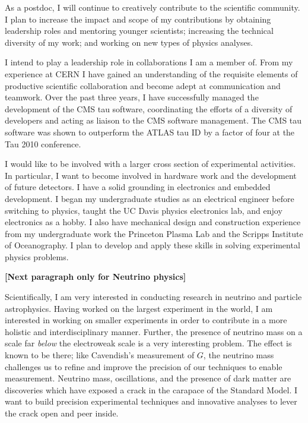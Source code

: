 \documentclass{scrartcl}        %
\begin{document}
\begin{cv}{}
As a postdoc, I will continue to creatively contribute to the scientific
community. I plan to increase the impact and scope of my contributions by
obtaining leadership roles and mentoring younger scientists; increasing the
technical diversity of my work; and working on new types of physics analyses.

I intend to play a leadership role in collaborations I am a member of. From my
experience at CERN I have gained an understanding of the requisite elements of
productive scientific collaboration and become adept at communication and
teamwork. Over the past three years, I have successfully managed the
development of the CMS tau software, coordinating the efforts of a diversity of
developers and acting as liaison to the CMS software management.  The CMS tau
software was shown to outperform the ATLAS tau ID by a factor of four at the Tau
2010 conference. 

I would like to be involved with a larger cross section of experimental
activities.  In particular, I want to become involved in hardware work and the
development of future detectors. I have a solid grounding in electronics and
embedded development. I began my undergraduate studies as an electrical engineer
before switching to physics, taught the UC Davis physics electronics lab, and
enjoy electronics as a hobby.  I also have mechanical design and construction
experience from my undergraduate work the Princeton Plasma Lab and the Scripps
Institute of Oceanography. I plan to develop and apply these skills in solving
experimental physics problems.

\textbf{[Next paragraph only for Neutrino physics]}

Scientifically, I am very interested in conducting research in neutrino and
particle astrophysics. Having worked on the largest experiment in the world, I
am interested in working on smaller experiments in order to contribute in a more
holistic and interdisciplinary manner. Further, the presence of neutrino mass on
a scale far \emph{below} the electroweak scale is a very interesting problem.
The effect is known to be there; like Cavendish's measurement of $G$, the
neutrino mass challenges us to refine and improve the precision of our
techniques to enable measurement. Neutrino mass, oscillations, and the presence
of dark matter are discoveries which have exposed a crack in the carapace of the
Standard Model.  I want to build precision experimental techniques and
innovative analyses to lever the crack open and peer inside.


\end{cv}
\end{document}
